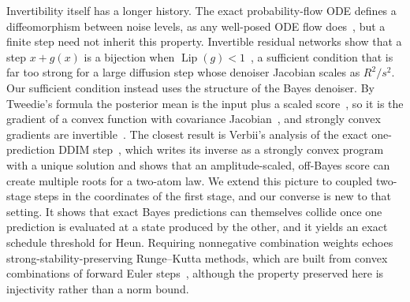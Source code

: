Invertibility itself has a longer history. The exact probability-flow ODE defines a diffeomorphism between noise levels, as any well-posed ODE flow does~\cite{songsde2021,chen2018node}, but a finite step need not inherit this property. Invertible residual networks show that a step $x+g(x)$ is a bijection when $\operatorname{Lip}(g)<1$~\cite{behrmann2019iresnet}, a sufficient condition that is far too strong for a large diffusion step whose denoiser Jacobian scales as $R^2/s^2$. Our sufficient condition instead uses the structure of the Bayes denoiser. By Tweedie's formula the posterior mean is the input plus a scaled score~\cite{efron2011tweedie}, so it is the gradient of a convex function with covariance Jacobian~\cite{gribonval2021}, and strongly convex gradients are invertible~\cite{huang2021}. The closest result is Verbii's analysis of the exact one-prediction DDIM step~\cite{verbii2026}, which writes its inverse as a strongly convex program with a unique solution and shows that an amplitude-scaled, off-Bayes score can create multiple roots for a two-atom law. We extend this picture to coupled two-stage steps in the coordinates of the first stage, and our converse is new to that setting. It shows that exact Bayes predictions can themselves collide once one prediction is evaluated at a state produced by the other, and it yields an exact schedule threshold for Heun. Requiring nonnegative combination weights echoes strong-stability-preserving Runge--Kutta methods, which are built from convex combinations of forward Euler steps~\cite{gottlieb2001,gottlieb2018}, although the property preserved here is injectivity rather than a norm bound.
